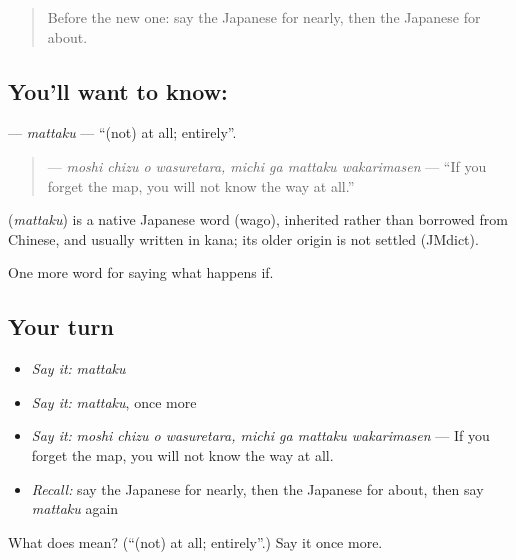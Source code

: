 \label{lesson:JA-C530-mattaku}



\begin{quote}
Before the new one: say the Japanese for nearly, then the Japanese for about.
\end{quote}

\subsection*{You'll want to know: }
\textbf{} — \emph{mattaku} — \textquotedblleft{}(not) at all; entirely\textquotedblright{}.

\begin{quote}
\textbf{    } — \emph{moshi chizu o wasuretara, michi ga mattaku wakarimasen} — \textquotedblleft{}If you forget the map, you will not know the way at all.\textquotedblright{}
\end{quote}

\begin{cousinweb}
\textbf{} (\emph{mattaku}) is a native Japanese word (wago), inherited rather than borrowed from Chinese, and usually written in kana; its older origin is not settled (JMdict).
\end{cousinweb}

\begin{grammarlens}[title={What you've built}]
One more word for saying what happens if.
\end{grammarlens}

\subsection*{Your turn}
\begin{itemize}
\raggedright
  \item \emph{Say it:} \emph{mattaku}
  \item \emph{Say it:} \emph{mattaku}, once more
  \item \emph{Say it:} \emph{moshi chizu o wasuretara, michi ga mattaku wakarimasen} — If you forget the map, you will not know the way at all.
  \item \emph{Recall:} say the Japanese for nearly, then the Japanese for about, then say \emph{mattaku} again
\end{itemize}

\begin{tcolorbox}[breakable,colback=teal!4,colframe=teal!35!black,title={Before you move on}]
What does  mean? (\textquotedblleft{}(not) at all; entirely\textquotedblright{}.) Say it once more.
\end{tcolorbox}
